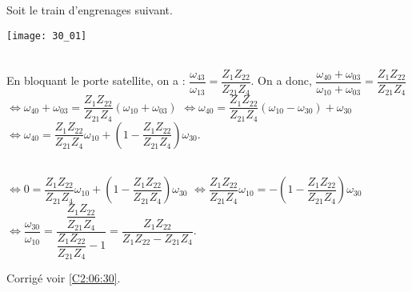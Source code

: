 \normaltrue \difficilefalse \tdifficilefalse
\correctiontrue


\setcounter{question}{0}

\ifcorrection
\else
{}
\fi

\ifprof
\else
Soit le train d'engrenages suivant. 
\begin{marginfigure}
\texttt{[image: 30\_01]}
\end{marginfigure}
\fi


\ifprof
\else
\fi

\ifprof ~\\
 En bloquant le porte satellite, on a : $\dfrac{\omega_{43}}{\omega_{13}}=\dfrac{Z_{1}Z_{22}}{Z_{21}Z_{4}}$.
  On a donc, 
  $\dfrac{\omega_{40}+\omega_{03}}{\omega_{10}+\omega_{03}}=
\dfrac{Z_{1}Z_{22}}{Z_{21}Z_{4}}$
  $\Leftrightarrow \omega_{40}+\omega_{03}=\dfrac{Z_{1}Z_{22}}{Z_{21}Z_{4}}\left( \omega_{10}+\omega_{03} \right)$
  $\Leftrightarrow \omega_{40}=\dfrac{Z_{1}Z_{22}}{Z_{21}Z_{4}}\left( \omega_{10}-\omega_{30} \right) + \omega_{30}$
 $\Leftrightarrow \omega_{40}=\dfrac{Z_{1}Z_{22}}{Z_{21}Z_{4}}\omega_{10} +\left(1- \dfrac{Z_{1}Z_{22}}{Z_{21}Z_{4}}\right)\omega_{30}$.
\else
\fi

\ifprof~\\
$\Leftrightarrow 0=\dfrac{Z_{1}Z_{22}}{Z_{21}Z_{4}}\omega_{10} +\left(1- \dfrac{Z_{1}Z_{22}}{Z_{21}Z_{4}}\right)\omega_{30}$
$\Leftrightarrow  \dfrac{Z_{1}Z_{22}}{Z_{21}Z_{4}}\omega_{10} =-\left(1- \dfrac{Z_{1}Z_{22}}{Z_{21}Z_{4}}\right)\omega_{30}$
$\Leftrightarrow  \dfrac{\omega_{30}}{\omega_{10}} = \dfrac{ \dfrac{Z_{1}Z_{22}}{Z_{21}Z_{4}}}{ \dfrac{Z_{1}Z_{22}}{Z_{21}Z_{4}}-1}= \dfrac{ {Z_{1}Z_{22}}}{ {Z_{1}Z_{22}}-Z_{21}Z_{4}}$.
\else
\fi


\ifprof
\else
{}
\fi


\ifprof
\else
\begin{flushright}
\footnotesize{Corrigé  voir \ref{C2:06:30}.}
\end{flushright}%
\fi